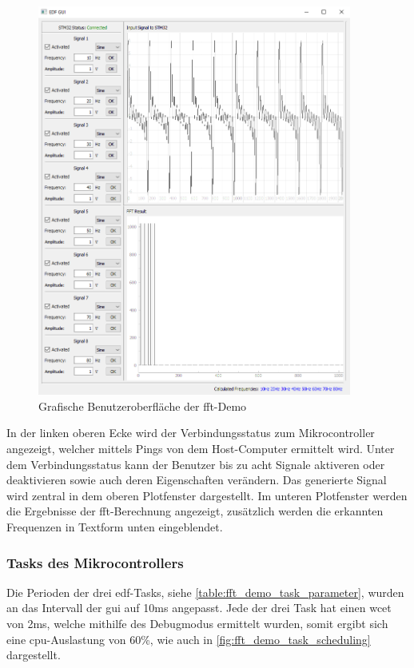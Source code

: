 \documentclass[../EDF Master Thesis.tex]{subfiles}
\begin{document}
            \begin{figure}[H]
                \centering
                \includegraphics[width=0.92\textwidth]{./attachments/gui.png}
                \caption{Grafische Benutzeroberfläche der \ac{fft}-Demo}
                \label{fig:grafische_benutzeroberflaeche}
            \end{figure}

        In der linken oberen Ecke wird der Verbindungsstatus zum Mikrocontroller angezeigt, welcher mittels Pings von dem Host-Computer ermittelt wird.
        Unter dem Verbindungsstatus kann der Benutzer bis zu acht Signale aktiveren oder deaktivieren sowie auch deren Eigenschaften verändern.
        Das generierte Signal wird zentral in dem oberen Plotfenster dargestellt.
        Im unteren Plotfenster werden die Ergebnisse der \ac{fft}-Berechnung angezeigt, zusätzlich werden die erkannten Frequenzen in Textform unten eingeblendet.

        \subsubsection{Tasks des Mikrocontrollers}
            Die Perioden der drei \ac{edf}-Tasks, siehe \autoref{table:fft_demo_task_parameter}, wurden an das Intervall der \ac{gui} auf 10ms angepasst.
            Jede der drei Task hat einen \ac{wcet} von 2ms, welche mithilfe des Debugmodus ermittelt wurden, somit ergibt sich eine \ac{cpu}-Auslastung von 60\%, wie auch in \autoref{fig:fft_demo_task_scheduling} dargestellt.
\end{document}
